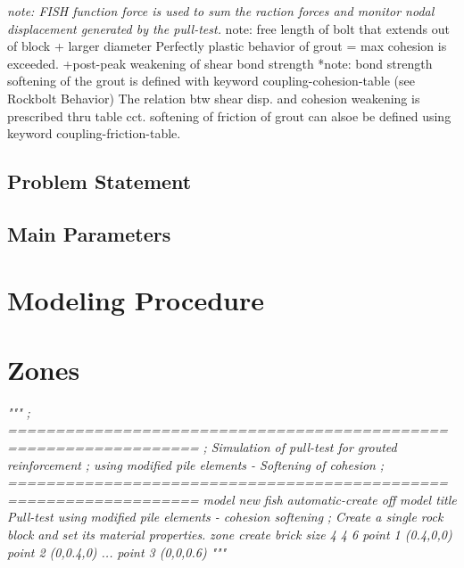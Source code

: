 \documentclass[a4paper, nobind]{templates/ociamthesis}
\newenvironment{Shaded}{\begin{snugshade}}{\end{snugshade}}
\newcommand{\CommentTok}[1]{\textcolor[rgb]{0.56,0.35,0.01}{\textit{#1}}}
\renewenvironment{Shaded}
{
  \vspace{10pt}%
  \begin{snugshade}%
}{%
  \end{snugshade}%
  \vspace{8pt}%
}
\begin{document}
\emph{note: FISH function force is used to sum the raction forces and
monitor nodal displacement generated by the pull-test.
}note: free length of bolt that extends out of block + larger diameter
Perfectly plastic behavior of grout = max cohesion is exceeded.
+post-peak weakening of shear bond strength
*note: bond strength softening of the grout is defined with keyword
coupling-cohesion-table (see Rockbolt Behavior)
The relation btw shear disp. and cohesion weakening is prescribed
thru table cct. softening of friction of grout can alsoe be defined
using keyword coupling-friction-table.

\hypertarget{problem-statement-1}{%
\subsection{Problem Statement}\label{problem-statement-1}}

\hypertarget{main-parameters-1}{%
\subsection{Main Parameters}\label{main-parameters-1}}

\hypertarget{modeling-procedure-1}{%
\section{Modeling Procedure}\label{modeling-procedure-1}}

\hypertarget{zones-3}{%
\section{Zones}\label{zones-3}}

\begin{Shaded}
\begin{Highlighting}[]
\CommentTok{"""}
\CommentTok{; ==================================================================}
\CommentTok{;   Simulation of pull{-}test for grouted reinforcement}
\CommentTok{;   using modified pile elements {-} Softening of cohesion}
\CommentTok{; ==================================================================}
\CommentTok{model new }
\CommentTok{fish automatic{-}create off}
\CommentTok{model title \textquotesingle{}Pull{-}test using modified pile elements {-} cohesion softening\textquotesingle{}}
\CommentTok{; Create a single rock block and set its material properties.}
\CommentTok{zone create brick size 4 4 6 point 1 (0.4,0,0) point 2 (0,0.4,0) ...}
\CommentTok{                             point 3 (0,0,0.6)}
\CommentTok{"""}
\end{Highlighting}
\end{Shaded}
\end{document}
